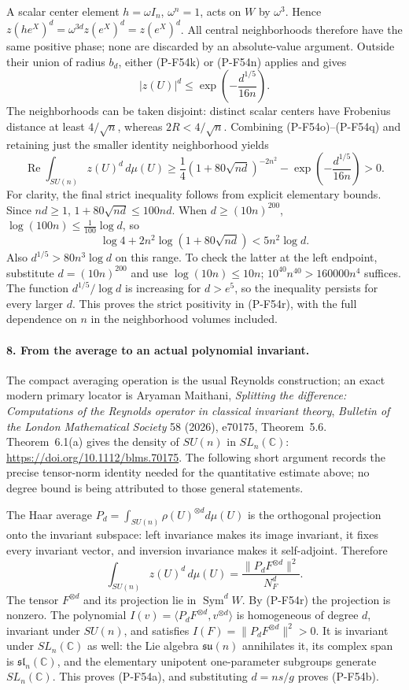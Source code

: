 \documentclass[11pt,a4paper]{article}
\begin{document}
A scalar center element $h=\omega I_n$, $\omega^n=1$,
acts on $W$ by $\omega^3$. Hence
$z(he^X)^d=\omega^{3d}z(e^X)^d=z(e^X)^d$.
All central neighborhoods therefore have the same positive
phase; none are discarded by an absolute-value argument.
Outside their union of radius $b_d$, either (P-F54k) or
(P-F54n) applies and gives
\[
       |z(U)|^d\le
           \exp\left(-\frac{d^{1/5}}{16n}\right).             \tag{P-F54q}
\]
The neighborhoods can be taken disjoint: distinct scalar
centers have Frobenius distance at least $4/\sqrt n$,
whereas $2R<4/\sqrt n$. Combining (P-F54o)--(P-F54q)
and retaining just the smaller identity neighborhood yields
\[
 \operatorname{Re}\int_{SU(n)}z(U)^d\,d\mu(U)
 \ge\frac14(1+80\sqrt{nd})^{-2n^2}
        -\exp\left(-\frac{d^{1/5}}{16n}\right)>0.             \tag{P-F54r}
\]
For clarity, the final strict inequality follows from explicit
elementary bounds. Since $nd\ge1$,
$1+80\sqrt{nd}\le100nd$.
When $d\ge(10n)^{200}$,
$\log(100n)\le\frac1{100}\log d$, so
\[
 \log4+2n^2\log(1+80\sqrt{nd})<5n^2\log d.
\]
Also $d^{1/5}>80n^3\log d$ on this range.
To check the latter at the left endpoint, substitute
$d=(10n)^{200}$ and use $\log(10n)\le10n$;
$10^{40}n^{40}>160000n^4$ suffices.
The function $d^{1/5}/\log d$ is increasing for $d>e^5$,
so the inequality persists for every larger $d$.
This proves the strict positivity in (P-F54r), with the
full dependence on $n$ in the neighborhood volumes included.

\paragraph{8. From the average to an actual polynomial invariant.}
The compact averaging operation is the usual Reynolds
construction; an exact modern primary locator is Aryaman
Maithani, \emph{Splitting the difference: Computations of the
Reynolds operator in classical invariant theory},
\emph{Bulletin of the London Mathematical Society} 58 (2026),
e70175, Theorem~5.6. Theorem~6.1(a) gives the density of
$SU(n)$ in $SL_n(\mathbb C)$:
\url{https://doi.org/10.1112/blms.70175}.
The following short argument records the precise tensor-norm
identity needed for the quantitative estimate above; no degree
bound is being attributed to those general statements.

The Haar average $P_d=\int_{SU(n)}\rho(U)^{\otimes d}d\mu(U)$
is the orthogonal projection onto the invariant subspace:
left invariance makes its image invariant, it fixes every
invariant vector, and inversion invariance makes it
self-adjoint. Therefore
\[
 \int_{SU(n)}z(U)^d\,d\mu(U)
             =\frac{\|P_dF^{\otimes d}\|^2}{N_F^d}.           \tag{P-F54s}
\]
The tensor $F^{\otimes d}$ and its projection lie in
$\operatorname{Sym}^dW$.
By (P-F54r) the projection is nonzero.
The polynomial
$I(v)=\langle P_dF^{\otimes d},v^{\otimes d}\rangle$
is homogeneous of degree $d$, invariant under $SU(n)$,
and satisfies $I(F)=\|P_dF^{\otimes d}\|^2>0$.
It is invariant under $SL_n(\mathbb C)$ as well:
the Lie algebra $\mathfrak{su}(n)$ annihilates it, its
complex span is $\mathfrak{sl}_n(\mathbb C)$, and the
elementary unipotent one-parameter subgroups generate
$SL_n(\mathbb C)$. This proves (P-F54a), and substituting
$d=ns/g$ proves (P-F54b).
\end{document}
